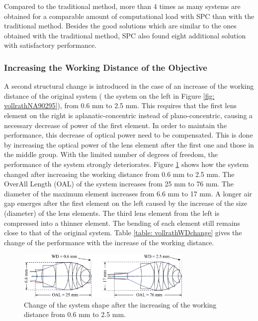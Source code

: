 Compared to the traditional method, more than 4 times as many systems are obtained for a comparable amount of computational load with SPC than with the traditional method. Besides the good solutions which are similar to the ones obtained with the traditional method, SPC also found eight additional solution with satisfactory performance. 

\newpage
\subsubsection{Increasing the Working Distance of the Objective}
A second structural change is introduced in the case of an increase of the working distance of the original system ( the system on the left in Figure \ref{fig: vollrathNA90295}), from 0.6 mm to 2.5 mm. This requires that the first lens element on the right is aplanatic-concentric instead of plano-concentric, causing a necessary decrease of power of the first element. In order to maintain the performance, this decrease of optical power need to be compensated. This is done by increasing the optical power of the lens element after the first one and those in the middle group. With the limited number of degrees of freedom, the performance of the system strongly deteriorates. Figure \ref{fig: vollrathWD06to25} shows how the system changed after increasing the working distance from 0.6 mm to 2.5 mm. The OverAll Length (OAL) of the system increases from 25 mm to 76 mm. The diameter of the maximum element increases from 6.6 mm to 17 mm. A longer air gap emerges after the first element on the left caused by the increase of the size (diameter) of the lens elements. The third lens element from the left is compressed into a thinner element. The bending of each element still remains close to that of the original system. Table \ref{table: vollrathWDchange} gives the change of the performance with the increase of the working distance. 

\begin{figure}[h!]
    \centering
    \includegraphics[width=0.75\textwidth]{chapter-4/figures/Vollrath_WD06TO25.png}
    \caption{Change of the system shape after the increasing of the working distance from 0.6 mm to 2.5 mm.}
    \label{fig: vollrathWD06to25}
\end{figure}

